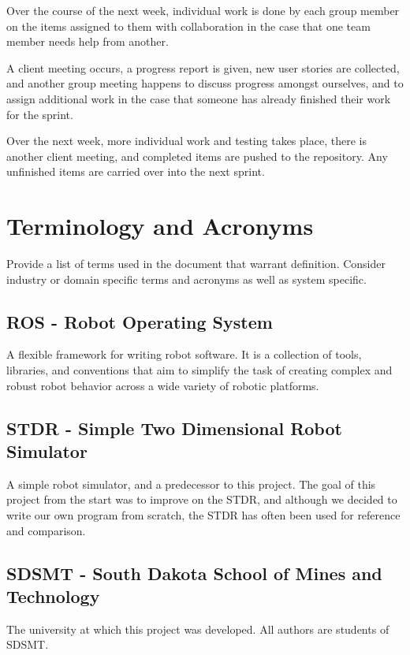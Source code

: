 Over the course of the next week, individual work is done by each group member on the items assigned to them with collaboration in the case that one team member needs help from another.

A client meeting occurs, a progress report is given, new user stories are collected, and another group meeting happens to discuss progress amongst ourselves, and to assign additional work in the case that someone has already finished their work for the sprint.

Over the next week, more individual work and testing takes place, there is another client meeting, and completed items are pushed to the repository. Any unfinished items are carried over into the next sprint.

\section{Terminology and Acronyms}
Provide a list of terms used in the document that warrant definition.  Consider 
industry or domain specific terms and acronyms as well as system specific. 

\subsection{ROS - Robot Operating System}
A flexible framework for writing robot software. It is a collection of tools, libraries, and conventions that aim to simplify the task of creating complex and robust robot behavior across a wide variety of robotic platforms.

\subsection{STDR - Simple Two Dimensional Robot Simulator}
A simple robot simulator, and a predecessor to this project. The goal of this project from the start was to improve on the STDR, and although we decided to write our own program from scratch, the STDR has often been used for reference and comparison.

\subsection{SDSMT - South Dakota School of Mines and Technology}
The university at which this project was developed. All authors are students of SDSMT.

